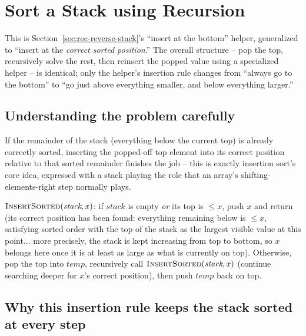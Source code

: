 \section{Sort a Stack using Recursion}
\label{sec:rec-sort-stack}


\begin{patternbox}
This is Section~\ref{sec:rec-reverse-stack}'s ``insert at the bottom''
helper, generalized to ``insert at the \emph{correct sorted position}.''
The overall structure -- pop the top, recursively solve the rest, then
reinsert the popped value using a specialized helper -- is identical;
only the helper's insertion rule changes from ``always go to the
bottom'' to ``go just above everything smaller, and below everything
larger.''
\end{patternbox}

\subsection*{Understanding the problem carefully}

If the remainder of the stack (everything below the current top) is
already correctly sorted, inserting the popped-off top element into its
correct position relative to that sorted remainder finishes the job --
this is exactly insertion sort's core idea, expressed with a stack
playing the role that an array's shifting-elements-right step normally
plays.

\begin{ideabox}
$\textsc{InsertSorted}(\textit{stack}, x)$: if $\textit{stack}$ is empty
\emph{or} its top is $\le x$, push $x$ and return (its correct position
has been found: everything remaining below is $\le x$, satisfying sorted
order with the top of the stack as the largest visible value at this
point... more precisely, the stack is kept increasing from top to
bottom, so $x$ belongs here once it is at least as large as what is
currently on top). Otherwise, pop the top into $\textit{temp}$,
recursively call $\textsc{InsertSorted}(\textit{stack}, x)$ (continue
searching deeper for $x$'s correct position), then push $\textit{temp}$
back on top.
\end{ideabox}

\subsection*{Why this insertion rule keeps the stack sorted at every step}

